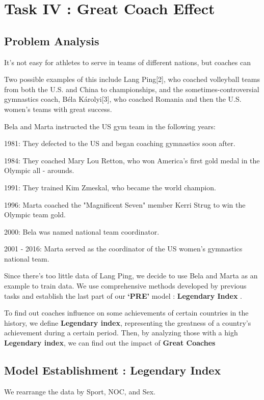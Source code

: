 

\section{Task IV : Great Coach Effect}

\subsection{Problem Analysis}
It's not easy for athletes to serve in teams of different nations, but coaches can

Two possible examples of this include Lang Ping[2],
who coached volleyball teams from both the U.S. and China to championships, and the
sometimes-controversial gymnastics coach, Béla Károlyi[3], who coached Romania and
then the U.S. women’s teams with great success. 

Bela and Marta instructed the US gym team in the following years:

1981: They defected to the US and began coaching gymnastics soon after.

1984: They coached Mary Lou Retton, who won America's first gold medal in the Olympic all - arounds.

1991: They trained Kim Zmeskal, who became the world champion.

1996: Marta coached the "Magnificent Seven" member Kerri Strug to win the Olympic team gold.

2000: Bela was named national team coordinator.

2001 - 2016: Marta served as the coordinator of the US women's gymnastics national team.

Since there's too little data of Lang Ping, we decide to use Bela and Marta as an example to train data. We use comprehensive methods developed by previous tasks and establish the last part of our \textbf{`PRE'} model : \textbf{Legendary Index} .

To find out coaches influence on some achievements of certain countries in the history, we define \textbf{Legendary index}, representing the greatness of a country's achievement during a certain period.
Then, by analyzing those with a high \textbf{Legendary index}, we can find out the impact of \textbf{Great Coaches}

\subsection{Model Establishment : Legendary Index}
We rearrange the data by Sport, NOC, and Sex. 

